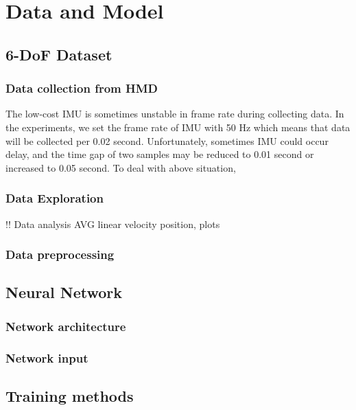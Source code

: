 \chapter{Data and Model}
\label{sec:design}

\section{6-DoF Dataset}
\label{sec:design:dataset}

\subsection{Data collection from HMD}
\label{sec:design:dataset:HL}
The low-cost IMU is sometimes unstable in frame rate during collecting data. In the experiments, we set the frame rate of IMU with 50 Hz which means that data will be collected per 0.02 second. Unfortunately, sometimes IMU could occur delay, and the time gap of two samples may be reduced to 0.01 second or increased to 0.05 second. To deal with above situation,

\subsection{Data Exploration}
\label{sec:design:dataset:explor}
!! Data analysis AVG linear velocity position, plots 

\subsection{Data preprocessing}
\label{sec:design:dataset:preprocessing}


\section{Neural Network}
\label{sec:design:nn}

\subsection{Network architecture}
\label{sec:design:nn:architecture}

\subsection{Network input}
\label{sec:design:nn:input}


\section{Training methods}
\label{sec:design:train}
